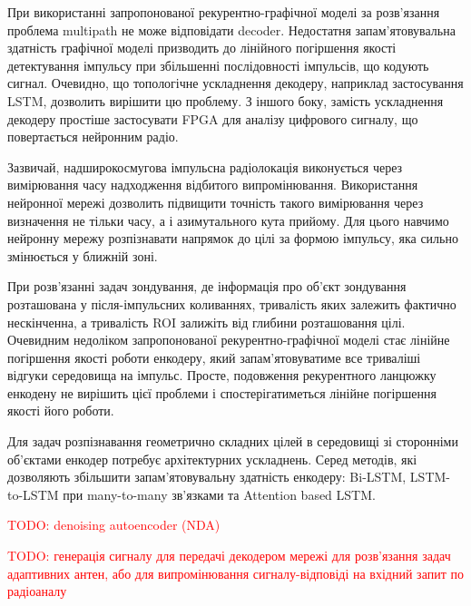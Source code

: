 При використанні запропонованої рекурентно-графічної моделі за розв'язання 
проблема multipath не може відповідати decoder. Недостатня запам'ятовувальна 
здатність графічної моделі призводить до лінійного погіршення якості 
детектування імпульсу при збільшенні послідовності імпульсів, що кодують 
сигнал. Очевидно, що топологічне ускладнення декодеру, наприклад застосування 
LSTM, дозволить вирішити цю проблему. З іншого боку, замість ускладнення 
декодеру простіше застосувати FPGA для аналізу цифрового сигналу, що 
повертається нейронним радіо.

Зазвичай, надширокосмугова імпульсна радіолокація виконується 
через вимірювання часу надходження відбитого випромінювання. Використання 
нейронної мережі дозволить підвищити точність такого вимірювання через 
визначення не тільки часу, а і азимутального кута прийому. Для цього навчимо 
нейронну мережу розпізнавати напрямок до цілі за формою імпульсу, яка сильно 
змінюється у ближній зоні.

При розв'язанні задач зондування, де інформація про об'єкт зондування 
розташована у після-імпульсних коливаннях, тривалість яких залежить фактично 
нескінченна, а тривалість ROI залижіть від глибини розташовання цілі. 
Очевидним недоліком запропонованої рекурентно-графічної моделі стає лінійне 
погіршення якості роботи енкодеру, який запам'ятовуватиме все триваліші
відгуки середовища на імпульс. Просте, подовження рекурентного ланцюжку 
енкодену не вирішить цієї проблеми і спостерігатиметься лінійне погіршення 
якості його роботи.

Для задач розпізнавання геометрично складних цілей в середовищі зі сторонніми
об'єктами енкодер потребує архітектурних ускладнень. Серед методів, які 
дозволяють збільшити запам'ятовувальну здатність енкодеру: Bi-LSTM, 
LSTM-to-LSTM при many-to-many зв'язками та Attention based LSTM.

\textcolor{red}{TODO: denoising autoencoder (NDA)}

\textcolor{red}{TODO: генерація сигналу для передачі декодером мережі для 
розв'язання задач адаптивних антен, або для випромінювання сигналу-відповіді 
на вхідний запит по радіоаналу}
